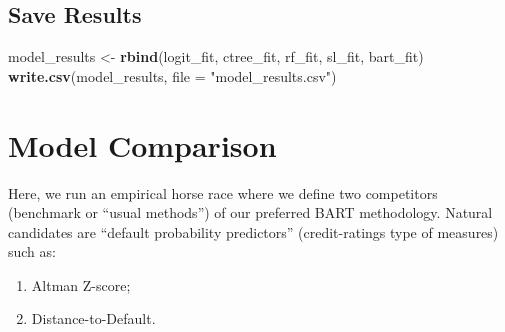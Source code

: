 \documentclass[]{article}
\newenvironment{Shaded}{\begin{snugshade}}{\end{snugshade}}
\newcommand{\DataTypeTok}[1]{\textcolor[rgb]{0.13,0.29,0.53}{#1}}
\newcommand{\KeywordTok}[1]{\textcolor[rgb]{0.13,0.29,0.53}{\textbf{#1}}}
\newcommand{\NormalTok}[1]{#1}
\newcommand{\OperatorTok}[1]{\textcolor[rgb]{0.81,0.36,0.00}{\textbf{#1}}}
\newcommand{\StringTok}[1]{\textcolor[rgb]{0.31,0.60,0.02}{#1}}
\begin{document}
\begin{Shaded}
\end{Shaded}

\hypertarget{save-results}{%
\subsection{Save Results}\label{save-results}}

\begin{Shaded}
\begin{Highlighting}[]
\NormalTok{model_results <-}\StringTok{ }\KeywordTok{rbind}\NormalTok{(logit_fit, ctree_fit, rf_fit, sl_fit, bart_fit)}
\KeywordTok{write.csv}\NormalTok{(model_results, }\DataTypeTok{file =} \StringTok{"model_results.csv"}\NormalTok{)}
\end{Highlighting}
\end{Shaded}

\hypertarget{model-comparison}{%
\section{Model Comparison}\label{model-comparison}}

Here, we run an empirical horse race where we define two competitors
(benchmark or ``usual methods'') of our preferred BART methodology.
Natural candidates are ``default probability predictors''
(credit-ratings type of measures) such as:

\begin{enumerate}
\item  Altman Z-score;
\item  Distance-to-Default.
\end{enumerate}
\end{document}
